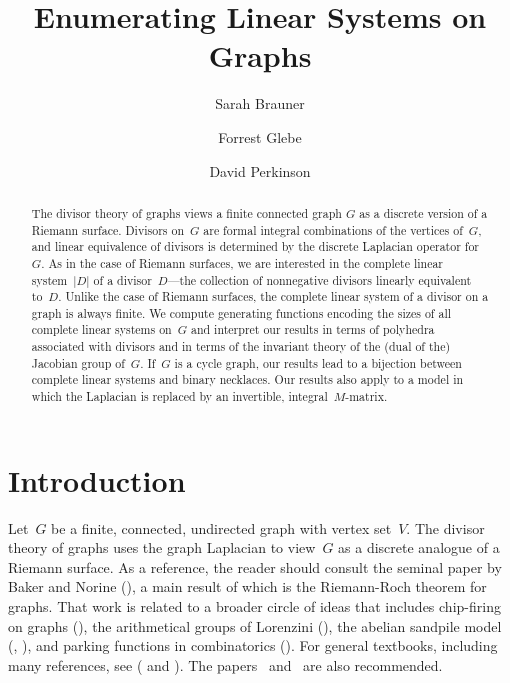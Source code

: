 \documentclass{amsart}
\title{Enumerating Linear Systems on Graphs}
\author{Sarah Brauner}
\author{Forrest Glebe}
\author{David Perkinson}
\begin{document}
\begin{abstract} The divisor theory of graphs views a finite connected graph $G$
  as a discrete version of a Riemann surface.  Divisors on~$G$ are formal
  integral combinations of the vertices of~$G$, and linear equivalence of
  divisors is determined by the discrete Laplacian operator for~$G$.  As in the
  case of Riemann surfaces, we are interested in the complete linear
  system~$|D|$ of a divisor~$D$---the collection of nonnegative divisors
  linearly equivalent to~$D$.  Unlike the case of Riemann surfaces, the complete
  linear system of a divisor on a graph is always finite.  We compute generating
  functions encoding the sizes of all complete linear systems on~$G$ and
  interpret our results in terms of polyhedra associated with divisors and in
  terms of the invariant theory of the (dual of the) Jacobian group of~$G$.
  If~$G$ is a cycle graph, our results lead to a bijection between complete
  linear systems and binary necklaces.  Our results also apply to a model in
  which the Laplacian is replaced by an invertible,
  integral~$M$-matrix.
\end{abstract}

\maketitle

\section{Introduction}

Let~$G$ be a finite, connected, undirected graph with vertex set~$V$.  The
divisor theory of graphs uses the graph Laplacian to view~$G$ as a discrete
analogue of a Riemann surface.  As a reference, the reader should consult the
seminal paper by Baker and Norine (\cite{Baker}), a main result of which is the
Riemann-Roch theorem for graphs.  That work is related to a broader circle of
ideas that includes chip-firing on graphs (\cite{Bjorner}), the arithmetical groups
of Lorenzini (\cite{Lorenzini}), the abelian sandpile model (\cite{BTW},
\cite{Dhar}), and parking functions in combinatorics (\cite{Postnikov}).  For
general textbooks, including many references, see (\cite{Corry} and
\cite{Klivans}).  The papers~\cite{Holroyd} and~\cite{Bacher} are also recommended.
\end{document}
